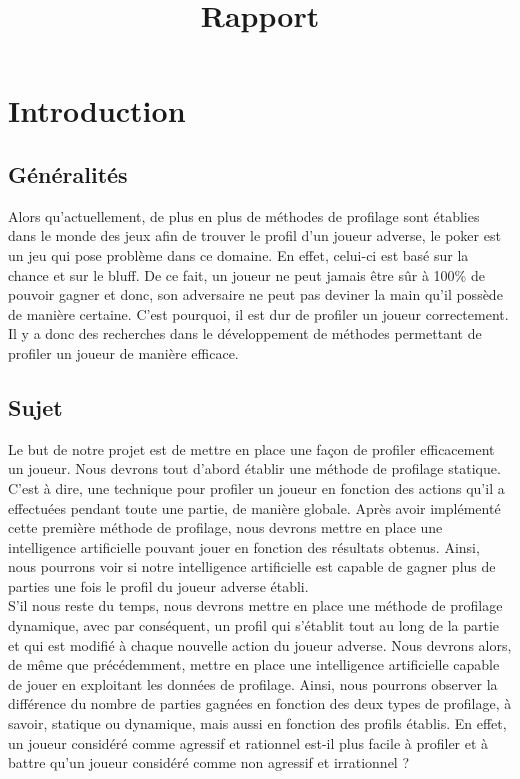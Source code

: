 \documentclass{report}
\title{Rapport}
\author{}
\date{}
\begin{document}


\newpage
\tableofcontents %
\newpage

\chapter{Introduction}
\section{Généralités}
\hspace{0.5cm}Alors qu'actuellement, de plus en plus de méthodes de profilage sont établies dans le monde des jeux afin de trouver le profil d'un joueur adverse, le poker est un jeu qui pose problème dans ce domaine. En effet, celui-ci est basé sur la chance et sur le bluff. De ce fait, un joueur ne peut jamais être sûr à 100\% de pouvoir gagner et donc, son adversaire ne peut pas deviner la main qu'il possède de manière certaine. C'est pourquoi, il est dur de profiler un joueur correctement. Il y a donc des recherches dans le développement de méthodes permettant de profiler un joueur de manière efficace. \par

\section{Sujet}
\hspace{0.5cm}Le but de notre projet est de mettre en place une façon de profiler efficacement un joueur. Nous devrons tout d'abord établir une méthode de profilage statique. C'est à dire, une technique pour profiler un joueur en fonction des actions qu'il a effectuées pendant toute une partie, de manière globale. Après avoir implémenté cette première méthode de profilage, nous devrons mettre en place une intelligence artificielle pouvant jouer en fonction des résultats obtenus. Ainsi, nous pourrons voir si notre intelligence artificielle est capable de gagner plus de parties une fois le profil du joueur adverse établi. \\

S'il nous reste du temps, nous devrons mettre en place une méthode de profilage dynamique, avec par conséquent, un profil qui s’établit tout au long de la partie et qui est modifié à chaque nouvelle action du joueur adverse. Nous devrons alors, de même que précédemment, mettre en place une intelligence artificielle capable de jouer en exploitant les données de profilage. Ainsi, nous pourrons observer la différence du nombre de parties gagnées en fonction des deux types de profilage, à savoir, statique ou dynamique, mais aussi en fonction des profils établis. En effet, un joueur considéré comme agressif et rationnel est-il plus facile à profiler et à battre qu'un joueur considéré comme non agressif et irrationnel ?\par
\end{document}
